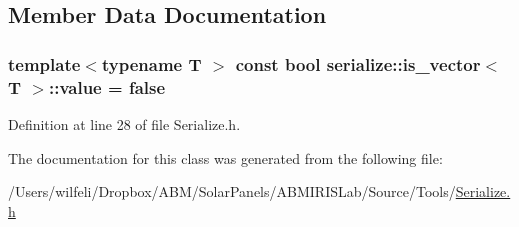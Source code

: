 \subsection{Member Data Documentation}
\hypertarget{classserialize_1_1is__vector_ad0b95082b20edc56d4884e210a7ab985}{}
\subsubsection[{value}]{\setlength{\rightskip}{0pt plus 5cm}template$<$typename T $>$ const bool {\bf serialize\+::is\+\_\+vector}$<$ T $>$\+::value = false\hspace{0.3cm}{\ttfamily [static]}}\label{classserialize_1_1is__vector_ad0b95082b20edc56d4884e210a7ab985}


Definition at line 28 of file Serialize.\+h.



The documentation for this class was generated from the following file\+:\begin{DoxyCompactItemize}
\item 
/\+Users/wilfeli/\+Dropbox/\+A\+B\+M/\+Solar\+Panels/\+A\+B\+M\+I\+R\+I\+S\+Lab/\+Source/\+Tools/\hyperlink{_serialize_8h}{Serialize.\+h}\end{DoxyCompactItemize}
